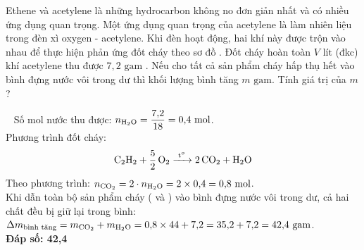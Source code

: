 \documentclass[12pt,a4paper]{article}
\renewcommand{\loigiai}[1]{%
  \par\smallskip\noindent{\color{blue!80!black}\textbf{Lời giải:}}\ #1\par\smallskip
}
\begin{document}
\begin{ex}
Ethene và acetylene là những hydrocarbon không no đơn giản nhất và có nhiều ứng dụng quan trọng. Một ứng dụng quan trọng của acetylene là làm nhiên liệu trong đèn xì oxygen - acetylene. Khi đèn hoạt động, hai khí này được trộn vào nhau để thực hiện phản ứng đốt cháy theo sơ đồ . Đốt cháy hoàn toàn $V\text{ lít}$ (đkc) khí acetylene thu được $7{,}2\text{ gam}$ . Nếu cho tất cả sản phẩm cháy hấp thụ hết vào bình đựng nước vôi trong dư thì khối lượng bình tăng $m\text{ gam}$. Tính giá trị của $m$?
\par{}
\loigiai{
Số mol nước thu được: $n_{} = \dfrac{7{,}2}{18} = 0{,}4\text{ mol}$.\\
Phương trình đốt cháy:
$$\ce{C2H2 + 5/2 O2 ->[t^o] 2 CO2 + H2O}$$
Theo phương trình: $n_{\ce{CO2}} = 2 \cdot n_{\ce{H2O}} = 2 \times 0{,}4 = 0{,}8\text{ mol}$.\\
Khi dẫn toàn bộ sản phẩm cháy (\ce{CO2} và \ce{H2O}) vào bình đựng nước vôi trong dư, cả hai chất đều bị giữ lại trong bình:\\
$\Delta m_{\text{bình tăng}} = m_{\ce{CO2}} + m_{\ce{H2O}} = 0{,}8 \times 44 + 7{,}2 = 35{,}2 + 7{,}2 = 42{,}4\text{ gam}$.\\
\textbf{Đáp số: 42,4}
}
\end{ex}
\end{document}
